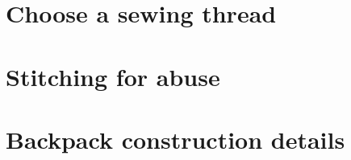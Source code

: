 \section{Choose a sewing thread}\label{sec:sewing-thread}


\section{Stitching for abuse}\label{sec:stitching-for-abuse}


\section{Backpack construction details}\label{sec:construction-details}

